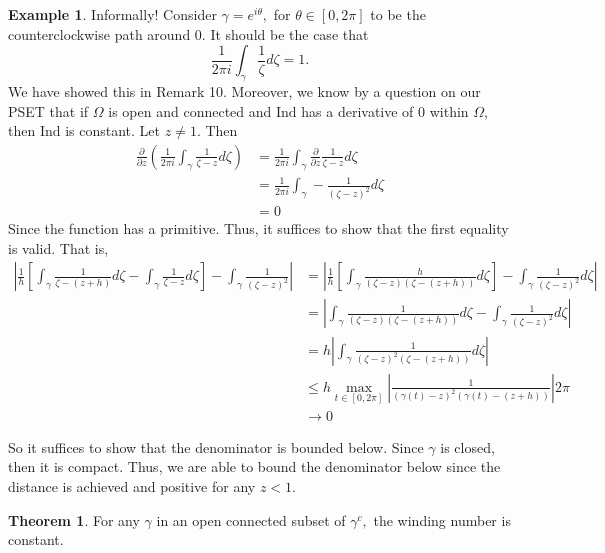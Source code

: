 \documentclass[10pt, oneside]{article}
\newcommand{\Ind}{\text{Ind}}
\theoremstyle{definition}
\newtheorem{exmp}{Example}[section]
\newtheorem{thm}{Theorem}
\begin{document}
\begin{exmp}
    Informally! Consider $\gamma = e^{i\theta},$ for $\theta \in [0,2\pi]$ to be the counterclockwise path around $0.$ It should be the case that  
    \[\frac{1}{2\pi i } \int_\gamma \frac{1}{\zeta}d\zeta = 1.\] We have showed this in Remark 10. Moreover, we know by a question on our PSET that if $\Omega$ is open and connected and $\Ind$ has a derivative of $0$ within $\Omega,$ then $\Ind$ is constant. Let $z \neq 1.$ Then 
    \begin{align*}
        \frac{\partial}{\partial z}\left(\frac{1}{2\pi i }\int_\gamma \frac{1}{\zeta - z}d\zeta\right)
        &= \frac{1}{2\pi i}\int_{\gamma} \frac{\partial}{\partial z} \frac{1}{\zeta - z}d\zeta\\
        &= \frac{1}{2\pi i} \int_\gamma -\frac{1}{(\zeta - z)^2}d\zeta\\
        &= 0
    \end{align*}
    Since the function has a primitive. Thus, it suffices to show that the first equality is valid. That is, 
    \begin{align*}
        \left|\frac{1}{h}\left[\int_\gamma \frac{1}{\zeta - (z + h)}d\zeta - \int_\gamma \frac{1}{\zeta - z}d\zeta\right] - \int_\gamma \frac{1}{(\zeta - z)^2}\right|
        &= 
        \left|\frac{1}{h}\left[\int_\gamma \frac{h}{(\zeta - z)(\zeta - (z + h))}d\zeta\right] - \int_\gamma \frac{1}{(\zeta - z)^2}d\zeta\right|\\
        &= \left|\int_\gamma \frac{1}{(\zeta - z)(\zeta - (z + h))}d\zeta - \int_\gamma \frac{1}{(\zeta - z)^2}d\zeta\right|\\
        &= h\left|\int_\gamma \frac{1}{(\zeta - z)^2(\zeta - (z + h))}d\zeta\right|\\
        &\leq h \max_{t\in [0,2\pi]} |\frac{1}{(\gamma(t) - z)^2(\gamma(t) - (z + h))}| 2\pi\\
        &\to 0
    \end{align*}
\end{exmp}
So it suffices to show that the denominator is bounded below. Since $\gamma$ is closed, then it is compact. Thus, we are able to bound the denominator below since the distance is achieved and positive for any $z < 1.$

\begin{thm}
    For any $\gamma$ in an open connected subset of $\gamma^c,$ the winding number is constant. 
\end{thm}
\end{document}
